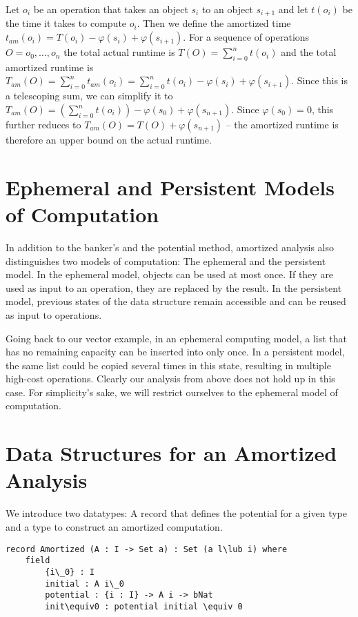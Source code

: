 Let $o_i$ be an operation that takes an object $s_i$ to an object $s_{i+1}$ and let $t(o_i)$ be the time it takes to compute $o_i$. Then we define the amortized time $t_{am}(o_i) = T(o_i) - \varphi(s_i) + \varphi(s_{i+1})$. For a sequence of operations $O = o_0, \ldots, o_n$ the total actual runtime is $T(O) = \sum_{i = 0}^n t(o_i)$ and the total amortized runtime is $T_{am}(O) = \sum_{i = 0}^n t_{am}(o_i) = \sum_{i = 0}^n t(o_i) - \varphi(s_i) + \varphi(s_{i+1})$. Since this is a telescoping sum, we can simplify it to $T_{am}(O) = \left(\sum_{i = 0}^n t(o_i)\right) - \varphi(s_0) + \varphi(s_{n+1})$. Since $\varphi(s_0) = 0$, this further reduces to $T_{am}(O) = T(O) + \varphi(s_{n+1})$ -- the amortized runtime is therefore an upper bound on the actual runtime.

\section{Ephemeral and Persistent Models of Computation}
In addition to the banker's and the potential method, amortized analysis also distinguishes two models of computation: The ephemeral and the persistent model. In the ephemeral model, objects can be used at most once. If they are used as input to an operation, they are replaced by the result. In the persistent model, previous states of the data structure remain accessible and can be reused as input to operations.

Going back to our vector example, in an ephemeral computing model, a list that has no remaining capacity can be inserted into only once. In a persistent model, the same list could be copied several times in this state, resulting in multiple high-cost operations. Clearly our analysis from above does not hold up in this case. For simplicity's sake, we will restrict ourselves to the ephemeral model of computation.

\section{Data Structures for an Amortized Analysis}
We introduce two datatypes: A record that defines the potential for a given type and a type to construct an amortized computation.

\begin{lstlisting}[caption={Record defining the potential for a type A},label={lst:amortized:framework:potential},emph={Amortized,initial,potential,init}]
record Amortized (A : I -> Set a) : Set (a l\lub i) where
    field
        {i\_0} : I
        initial : A i\_0
        potential : {i : I} -> A i -> bNat
        init\equiv0 : potential initial \equiv 0
\end{lstlisting}

